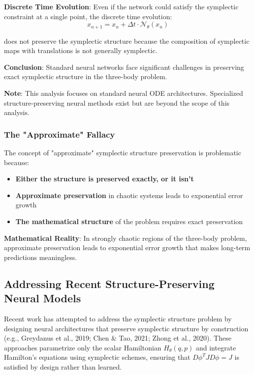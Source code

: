 \documentclass[11pt,a4paper]{article}
\begin{document}
\textbf{Discrete Time Evolution}: Even if the network could satisfy the symplectic constraint at a single point, the discrete time evolution:
\begin{equation}
x_{n+1} = x_n + \Delta t \cdot \mathcal{N}_\theta(x_n)
\end{equation}

does not preserve the symplectic structure because the composition of symplectic maps with translations is not generally symplectic.

\textbf{Conclusion}: Standard neural networks face significant challenges in preserving exact symplectic structure in the three-body problem.

\textbf{Note}: This analysis focuses on standard neural ODE architectures. Specialized structure-preserving neural methods exist but are beyond the scope of this analysis.

\subsubsection{The "Approximate" Fallacy}

The concept of "approximate" symplectic structure preservation is problematic because:

\begin{itemize}
    \item \textbf{Either the structure is preserved exactly, or it isn't}
    \item \textbf{Approximate preservation} in chaotic systems leads to exponential error growth
    \item \textbf{The mathematical structure} of the problem requires exact preservation
\end{itemize}

\textbf{Mathematical Reality}: In strongly chaotic regions of the three-body problem, approximate preservation leads to exponential error growth that makes long-term predictions meaningless.

\subsection{Addressing Recent Structure-Preserving Neural Models}

Recent work has attempted to address the symplectic structure problem by designing neural architectures that preserve symplectic structure by construction (e.g., Greydanus et al., 2019; Chen \& Tao, 2021; Zhong et al., 2020). These approaches parametrize only the scalar Hamiltonian $H_\theta(q,p)$ and integrate Hamilton's equations using symplectic schemes, ensuring that $D\phi^T J D\phi = J$ is satisfied by design rather than learned.
\end{document}
